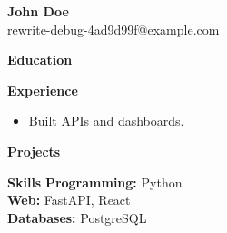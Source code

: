 \documentclass[10pt]{article}
\begin{document}
\begin{center}
    {\LARGE \textbf{John Doe}} \\
    rewrite-debug-4ad9d99f@example.com
\end{center}

\textbf{Education}

\textbf{Experience}
\begin{itemize}
\item Built APIs and dashboards.
\end{itemize}

\textbf{Projects}

\textbf{Skills}
\textbf{Programming:} Python\\
\textbf{Web:} FastAPI, React\\
\textbf{Databases:} PostgreSQL\\
\end{document}
